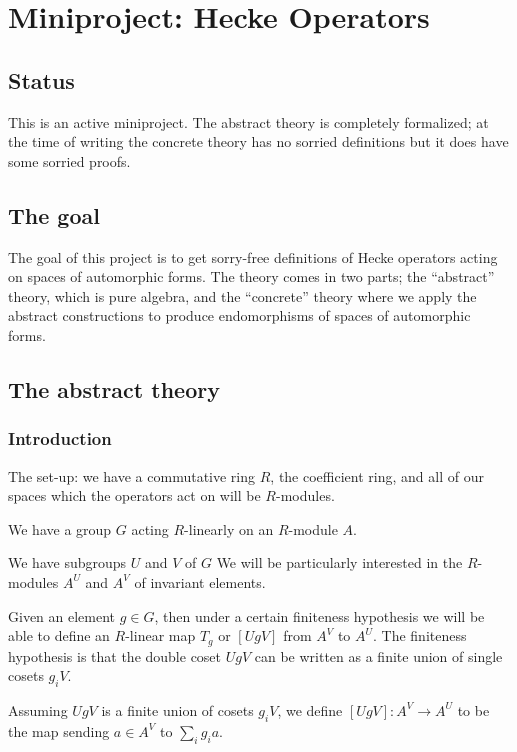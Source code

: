\chapter{Miniproject: Hecke Operators}\label{HeckeOperator_project}

\section{Status}

This is an active miniproject. The abstract theory is completely formalized;
at the time of writing the concrete theory has no sorried definitions
but it does have some sorried proofs.

\section{The goal}

The goal of this project is to get sorry-free definitions of Hecke operators
acting on spaces of automorphic forms. The theory comes in two parts;
the ``abstract'' theory, which is pure algebra, and the ``concrete'' theory
where we apply the abstract constructions to produce endomorphisms of
spaces of automorphic forms.

\section{The abstract theory}

\subsection{Introduction}

The set-up: we have a commutative ring $R$, the coefficient ring, and
all of our spaces which the operators act on will be $R$-modules.

We have a group $G$ acting $R$-linearly on an $R$-module $A$.

We have subgroups $U$ and $V$ of $G$
We will be particularly interested in the $R$-modules $A^U$ and $A^V$
of invariant elements.

Given an element $g\in G$, then under a certain finiteness hypothesis
we will be able to define an $R$-linear map $T_g$ or $[UgV]$
from $A^V$ to $A^U$. The finiteness hypothesis is that the
double coset $UgV$ can be written as a finite union of single
cosets $g_iV$.

\begin{definition}
  \label{AbstractHeckeOperator.HeckeOperator_toFun}
  \leanok
  Assuming $UgV$ is a finite union of cosets $g_iV$,
  we define $[UgV]:A^V\to A^U$ to be the map sending $a\in A^V$
  to $\sum_i g_ia.$
\end{definition}

